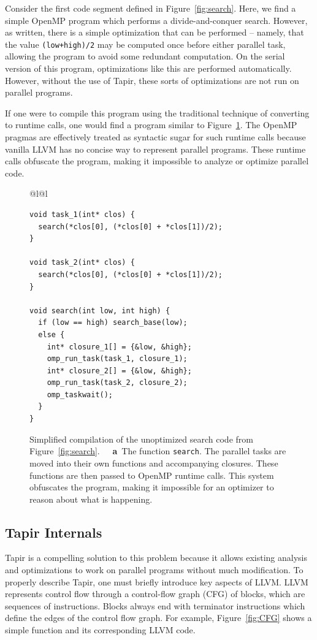 \documentclass[sigconf]{acmart}
\newcommand{\figref}[1]         {Figure~\ref{fig:#1}}
\newcommand{\subfigcap}[1]      {\textbf{~~#1}}
\def\code{\lstinline[basicstyle=\ttfamily\color{CodeColor}]}
\begin{document}
Consider the first code segment defined in \figref{search}.
Here, we find a simple OpenMP program which performs a divide-and-conquer search.
However, as written, there is a simple optimization that can be performed --
namely, that the value \code{(low+high)/2} may be computed once before either
parallel task, allowing the program to avoid some redundant computation. On
the serial version of this program, optimizations like this are performed
automatically. However, without the use of Tapir, these sorts of optimizations
are not run on parallel programs.

If one were to compile this program using the traditional technique of converting
to runtime calls, one would find a program similar to \figref{runtime_calls}.
The OpenMP pragmas are effectively treated as syntactic sugar for such runtime calls
because vanilla LLVM has no concise way to represent parallel programs.
These runtime calls obfuscate the program, making it impossible to analyze or
optimize parallel code.

\begin{figure}[t]
\begin{tabular*}{\linewidth}{@{\extracolsep{\fill}}l@{}l}
\begin{lstlisting}
void task_1(int* clos) {
  search(*clos[0], (*clos[0] + *clos[1])/2);
}

void task_2(int* clos) {
  search(*clos[0], (*clos[0] + *clos[1])/2);
}

void search(int low, int high) {
  if (low == high) search_base(low);
  else {
    int* closure_1[] = {&low, &high};
    omp_run_task(task_1, closure_1);
    int* closure_2[] = {&low, &high};
    omp_run_task(task_2, closure_2);
    omp_taskwait();
  } 
}
\end{lstlisting}
\vspace{0.1ex}
\end{tabular*}

\caption[Simplified compilation of the unoptimized search code from \figref{search}.]{Simplified compilation of the unoptimized search code from \figref{search}.  \subfigcap{a}~The function \code{search}. The parallel tasks are moved into their own functions and accompanying closures. These functions are then passed to OpenMP runtime calls. This system obfuscates the program, making it impossible for an optimizer to reason about what is happening.}
  \label{fig:runtime_calls}
\end{figure}

\subsection{Tapir Internals}
Tapir is a compelling solution to this problem because it allows existing
analysis and optimizations to work on parallel programs without much modification.
To properly describe Tapir, one must briefly introduce key aspects of LLVM.
LLVM represents control flow through a control-flow graph (CFG) of blocks,
which are sequences of instructions. Blocks always end with terminator instructions
which define the edges of the control flow graph. For example, \figref{CFG} shows a simple
function and its corresponding LLVM code.
\end{document}
